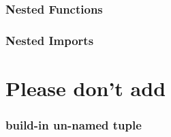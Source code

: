 \documentclass[aspectratio=169,notes]{beamer}
\begin{document}
	\begin{frame}[t]
		\frametitle{Nested Functions}
		
			
	\end{frame}

	\begin{frame}[t]
		\frametitle{Nested Imports}
		
	\end{frame}

	\section{Please don't add}

	\begin{frame}[t]
		\frametitle{build-in un-named tuple}
	\end{frame}
\end{document}
